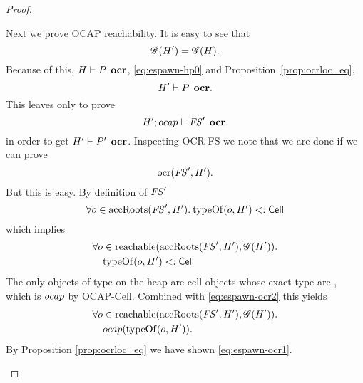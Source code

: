 \begin{proof}
\begin{description}
      Next we prove OCAP reachability. It is easy to see that
      \begin{equation} \label{eq:espawn-ocr0}
        \mathscr{G}(H') = \mathscr{G}(H).
      \end{equation}
      Because of this, $H \vdash P \:\: \mbox{\bf ocr}$, \eqref{eq:espawn-hp0} and
      Proposition~\ref{prop:ocrloc_eq},
      \begin{equation}
        H' \vdash P \:\: \mbox{\bf ocr}.
      \end{equation}
      This leaves only to prove
      \begin{equation}
        H'; \mbox{$ocap$} \vdash \mathit{FS}' \:\: \mbox{\bf ocr}.
      \end{equation}
      in order to get $H' \vdash P' \:\: \mbox{\bf ocr}$.
      Inspecting {\sc OCR-FS} we note that we are done if we can prove
      \begin{equation} \label{eq:espawn-ocr1}
        \mbox{$\mathrm{ocr}$}(\mathit{FS}', H').
      \end{equation}
      But this is easy. By definition of $\mathit{FS}'$
      \begin{equation}
        \forall o \in \mbox{$\mathrm{accRoots}$}(\mathit{FS}', H'). \: \mbox{$\mathrm{typeOf}$}(o, H') <: \mbox{$\mathsf{Cell}$}
      \end{equation}
      which implies
      \begin{equation} \label{eq:espawn-ocr2}
        \begin{aligned}
          \forall o &\in \mbox{$\mathrm{reachable}$}(\mbox{$\mathrm{accRoots}$}(\mathit{FS}', H'), \mathscr{G}(H')). \\
            &\mbox{$\mathrm{typeOf}$}(o, H') <: \mbox{$\mathsf{Cell}$}
        \end{aligned}
      \end{equation}
      The only objects of type \CellType{} on the heap are cell objects 
      whose exact type are \CellType{}, which is $\mbox{$ocap$}$ by {\sc OCAP-Cell}.
      Combined with \eqref{eq:espawn-ocr2} this yields
      \begin{equation}
        \begin{aligned}
          \forall o &\in \mbox{$\mathrm{reachable}$}(\mbox{$\mathrm{accRoots}$}(\mathit{FS}', H'), \mathscr{G}(H')). \\
            &\mbox{$ocap$}(\mbox{$\mathrm{typeOf}$}(o, H')).
        \end{aligned}
      \end{equation}
      By Proposition \ref{prop:ocrloc_eq} we have shown \eqref{eq:espawn-ocr1}.


\end{description}
\end{proof}
